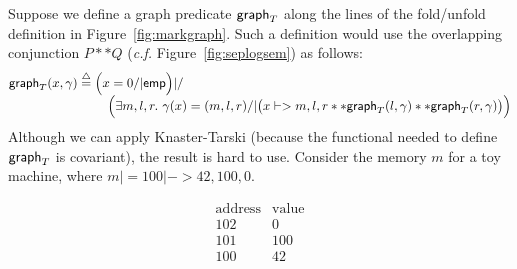 
Suppose we define a graph predicate $\mathsf{graph}_T$ along the lines of the fold/unfold definition in Figure~\ref{fig:markgraph}.  Such a definition would use the overlapping conjunction $P ** Q$ (\emph{c.f.} Figure~\ref{fig:seplogsem}) as follows: %
\vspace{-1ex}
\[
\begin{array}{@{}l@{}l@{}}
\graphkt(x, \gamma) \; \defeq \; &\Big(x = 0 /| \p{emp}\Big) |/ \\
&\quad \Big(\exists m,l,r.~ \gamma(x)=(m,l,r) /|
\big(x |-> m,l,r ** \graphkt(l, \gamma) ** \graphkt(r, \gamma)\big)\Big)
\end{array}
\vspace{-1ex}
\]
Although we can apply Knaster-Tarski (because the functional needed to
define $\mathsf{graph}_T$ is covariant), the result is hard to use.
Consider the memory $m$ for a toy machine, where $m |= 100 |-> 42,100,0$.


\begin{wrapfigure}{r}{.39\textwidth}
\vspace{-1em} %
\begin{minipage}{.20\textwidth}
\qquad \[
\begin{array}{c|c}
\textrm{address} & \textrm{value} \\
\hline
102 & 0 \\
101 & 100 \\
100 & 42 \\
\end{array}
\]
\end{minipage}%
\begin{minipage}{.19\textwidth}
\centering
\end{minipage}
\vspace{-0.5em} %
\end{wrapfigure}

